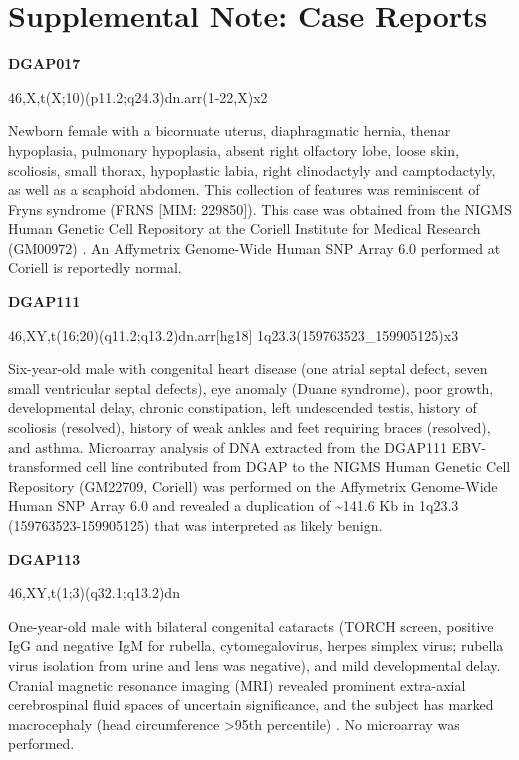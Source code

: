 \documentclass[a4paper,twoside=true,openright,parskip=full,chapterprefix=true,11pt,headings=normal,bibliography=totoc,listof=totoc,titlepage=on,captions=tableabove,draft=false]{scrreprt}
\theoremstyle{definition}
\theoremstyle{definition}
\theoremstyle{definition}
\theoremstyle{remark}
\begin{document}
\hypertarget{supplemental-note-case-reports}{%
\section{Supplemental Note: Case
Reports}\label{supplemental-note-case-reports}}

\textbf{DGAP017}

46,X,t(X;10)(p11.2;q24.3)dn.arr(1-22,X)x2

Newborn female with a bicornuate uterus, diaphragmatic hernia, thenar
hypoplasia, pulmonary hypoplasia, absent right olfactory lobe, loose
skin, scoliosis, small thorax, hypoplastic labia, right clinodactyly and
camptodactyly, as well as a scaphoid abdomen. This collection of
features was reminiscent of Fryns syndrome (FRNS {[}MIM: 229850{]}).
This case was obtained from the NIGMS Human Genetic Cell Repository at
the Coriell Institute for Medical Research (GM00972) \citep{Tang2013}.
An Affymetrix Genome-Wide Human SNP Array 6.0 performed at Coriell is
reportedly normal.

\textbf{DGAP111}

46,XY,t(16;20)(q11.2;q13.2)dn.arr{[}hg18{]}
1q23.3(159763523\_159905125)x3

Six-year-old male with congenital heart disease (one atrial septal
defect, seven small ventricular septal defects), eye anomaly (Duane
syndrome), poor growth, developmental delay, chronic constipation, left
undescended testis, history of scoliosis (resolved), history of weak
ankles and feet requiring braces (resolved), and asthma. Microarray
analysis of DNA extracted from the DGAP111 EBV-transformed cell line
contributed from DGAP to the NIGMS Human Genetic Cell Repository
(GM22709, Coriell) was performed on the Affymetrix Genome-Wide Human SNP
Array 6.0 and revealed a duplication of \textasciitilde{}141.6 Kb in
1q23.3 (159763523-159905125) that was interpreted as likely benign.

\textbf{DGAP113}

46,XY,t(1;3)(q32.1;q13.2)dn

One-year-old male with bilateral congenital cataracts (TORCH screen,
positive IgG and negative IgM for rubella, cytomegalovirus, herpes
simplex virus; rubella virus isolation from urine and lens was
negative), and mild developmental delay. Cranial magnetic resonance
imaging (MRI) revealed prominent extra-axial cerebrospinal fluid spaces
of uncertain significance, and the subject has marked macrocephaly (head
circumference \textgreater{}95th percentile) \citep{Lachke2012}. No
microarray was performed.
\end{document}

